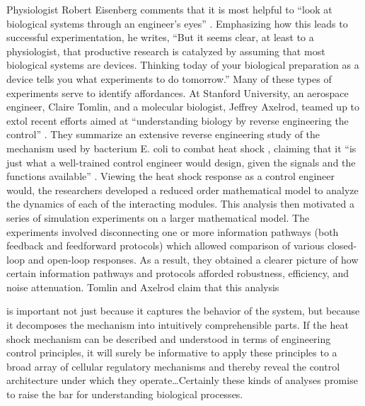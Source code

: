 Physiologist Robert Eisenberg comments that it is most helpful to “look
at biological systems through an engineer’s eyes” \citep[][p.~376]{eisenberg2007}.
Emphasizing how this leads to successful experimentation, he writes,
“But it seems clear, at least to a physiologist, that productive
research is catalyzed by assuming that most biological systems are
devices. Thinking today of your biological preparation as a device
tells you what experiments to do tomorrow.” Many of these types of
experiments serve to identify affordances. At Stanford University, an
aerospace engineer, Claire Tomlin, and a molecular biologist, Jeffrey
Axelrod, teamed up to extol recent efforts aimed at
``understanding biology by reverse engineering the
control'' \citep[][pp. 4219--4220]{tomlinaxelrod2005}. They summarize an extensive reverse
engineering study of the mechanism used by bacterium E. coli to combat
heat shock , claiming that it “is just what a
well-trained control engineer would design, given the signals and the
functions available” \citep[][4219]{tomlinaxelrod2005}. Viewing the heat shock response as a control
engineer would, the researchers developed a reduced order mathematical
model to analyze the dynamics of each of the interacting modules. This
analysis then motivated a series of simulation experiments on a larger
mathematical model. The experiments involved disconnecting one or more
information pathways (both feedback and feedforward protocols) which
allowed comparison of various closed-loop and open-loop responses. As a
result, they obtained a clearer picture of how certain information
pathways and protocols afforded robustness, efficiency, and noise
attenuation. Tomlin and Axelrod claim that this analysis 

\begin{quoting}
is important
not just because it captures the behavior of the system, but because it
decomposes the mechanism into intuitively comprehensible parts. If the
heat shock mechanism can be described and understood in terms of
engineering control principles, it will surely be informative to apply
these principles to a broad array of cellular regulatory mechanisms and
thereby reveal the control architecture under which they
operate{\ldots}Certainly these kinds of analyses promise to raise the bar for
understanding biological processes.
\end{quoting}

